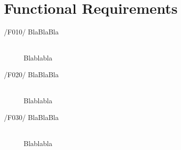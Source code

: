 \newpage
\section{Functional Requirements}

\begin{description}
\item[/F010/ BlaBlaBla]\hfill \\ Blablabla
\item[/F020/ BlaBlaBla]\hfill \\ Blablabla
\item[/F030/ BlaBlaBla]\hfill \\ Blablabla
\end{description}